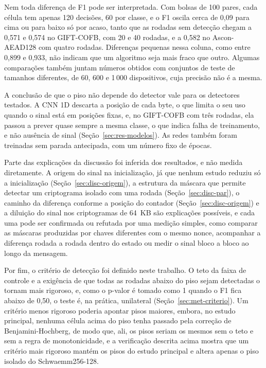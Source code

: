 Nem toda diferença de F1 pode ser interpretada. Com bolsas de 100 pares, cada célula tem apenas 120 decisões, 60 por classe, e o F1 oscila cerca de 0,09 para cima ou para baixo só por acaso, tanto que as rodadas sem detecção chegam a 0,571 e 0,574 no GIFT-COFB, com 20 e 40 rodadas, e a 0,582 no Ascon-AEAD128 com quatro rodadas. Diferenças pequenas nessa coluna, como entre 0,899 e 0,933, não indicam que um algoritmo seja mais fraco que outro. Algumas comparações também juntam números obtidos com conjuntos de teste de tamanhos diferentes, de 60, 600 e 1\,000 dispositivos, cuja precisão não é a mesma.

A conclusão de que o piso não depende do detector vale para os detectores testados. A CNN 1D descarta a posição de cada byte, o que limita o seu uso quando o sinal está em posições fixas, e, no GIFT-COFB com três rodadas, ela passou a prever quase sempre a mesma classe, o que indica falha de treinamento, e não ausência de sinal (Seção~\ref{sec:res-modelos}). As redes também foram treinadas sem parada antecipada, com um número fixo de épocas.

Parte das explicações da discussão foi inferida dos resultados, e não medida diretamente. A origem do sinal na inicialização, já que nenhum estudo reduziu só a inicialização (Seção~\ref{sec:disc-origem}), a estrutura da máscara que permite detectar um criptograma isolado com uma rodada (Seção~\ref{sec:disc-par}), o caminho da diferença conforme a posição do contador (Seção~\ref{sec:disc-origem}) e a diluição do sinal nos criptogramas de 64~KB são explicações possíveis, e cada uma pode ser confirmada ou refutada por uma medição simples, como comparar as máscaras produzidas por chaves diferentes com o mesmo nonce, acompanhar a diferença rodada a rodada dentro do estado ou medir o sinal bloco a bloco ao longo da mensagem.

Por fim, o critério de detecção foi definido neste trabalho. O teto da faixa de controle e a exigência de que todas as rodadas abaixo do piso sejam detectadas o tornam mais rigoroso, e, como o p-valor é tomado como 1 quando o F1 fica abaixo de 0,50, o teste é, na prática, unilateral (Seção~\ref{sec:met-criterio}). Um critério menos rigoroso poderia apontar pisos maiores, embora, no estudo principal, nenhuma célula acima do piso tenha passado pela correção de Benjamini-Hochberg, de modo que, ali, os pisos seriam os mesmos sem o teto e sem a regra de monotonicidade, e a verificação descrita acima mostra que um critério mais rigoroso mantém os pisos do estudo principal e altera apenas o piso isolado do Schwaemm256-128.


